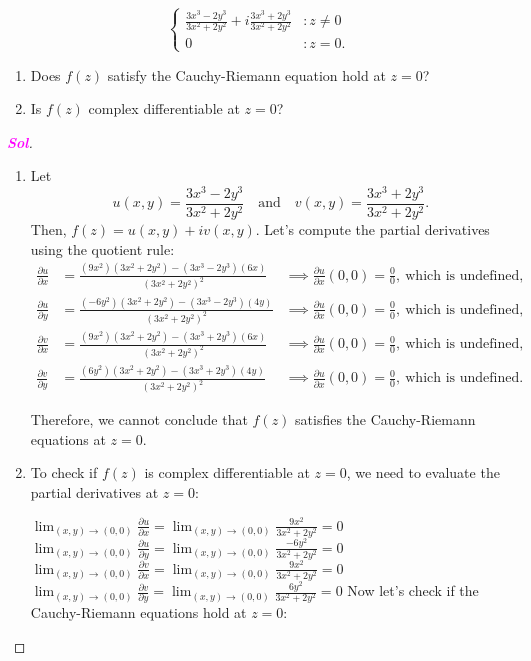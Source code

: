 \documentclass{article}
\theoremstyle{definition}
\newcommand{\of}[1]{\left( #1 \right)}
\newcommand{\sol}{\textcolor{magenta}{\bf Sol}}
\begin{document}
\begin{enumerate}
\[\begin{cases}
		\displaystyle\frac{3x^3-2y^3}{3x^2+2y^2}+i\frac{3x^3+2y^3}{3x^2+2y^2} &: z\neq 0\\
		0 &: z=0.
	\end{cases}
	\] \begin{enumerate}
		\item Does $f(z)$ satisfy the Cauchy-Riemann equation hold at $z=0$?
		\item Is $f(z)$ complex differentiable at $z=0$?
	\end{enumerate}
	\begin{proof}[\sol]
		\begin{enumerate}
			\item Let \[
			u(x, y) = \frac{3x^3 - 2y^3}{3x^2 + 2y^2}\quad\text{and}\quad v(x, y) = \frac{3x^3 + 2y^3}{3x^2 + 2y^2}.
			\] Then, $f(z) = u(x, y) + iv(x, y)$. Let's compute the partial derivatives using the quotient rule: \begin{align*}
				\frac{\partial u}{\partial x} &= \frac{(9x^2)(3x^2 + 2y^2) - (3x^3 - 2y^3)(6x)}{(3x^2 + 2y^2)^2} &\implies\frac{\partial u}{\partial x}\of{0,0}=\frac{0}{0},\ \text{which is undefined},\\
				\frac{\partial u}{\partial y} &= \frac{(-6y^2)(3x^2 + 2y^2) - (3x^3 - 2y^3)(4y)}{(3x^2 + 2y^2)^2}&\implies\frac{\partial u}{\partial x}\of{0,0}=\frac{0}{0},\ \text{which is undefined},\\
				\frac{\partial v}{\partial x} &= \frac{(9x^2)(3x^2 + 2y^2) - (3x^3 + 2y^3)(6x)}{(3x^2 + 2y^2)^2}&\implies\frac{\partial u}{\partial x}\of{0,0}=\frac{0}{0},\ \text{which is undefined},\\
				\frac{\partial v}{\partial y} &= \frac{(6y^2)(3x^2 + 2y^2) - (3x^3 + 2y^3)(4y)}{(3x^2 + 2y^2)^2}&\implies\frac{\partial u}{\partial x}\of{0,0}=\frac{0}{0},\ \text{which is undefined}.
			\end{align*}
			
			Therefore, we cannot conclude that $f(z)$ satisfies the Cauchy-Riemann equations at $z = 0$.
			
			\item To check if $f(z)$ is complex differentiable at $z = 0$, we need to evaluate the partial derivatives at $z = 0$:
			
			$\lim_{(x,y) \to (0,0)} \frac{\partial u}{\partial x} = \lim_{(x,y) \to (0,0)} \frac{9x^2}{3x^2 + 2y^2} = 0$
			$\lim_{(x,y) \to (0,0)} \frac{\partial u}{\partial y} = \lim_{(x,y) \to (0,0)} \frac{-6y^2}{3x^2 + 2y^2} = 0$
			$\lim_{(x,y) \to (0,0)} \frac{\partial v}{\partial x} = \lim_{(x,y) \to (0,0)} \frac{9x^2}{3x^2 + 2y^2} = 0$
			$\lim_{(x,y) \to (0,0)} \frac{\partial v}{\partial y} = \lim_{(x,y) \to (0,0)} \frac{6y^2}{3x^2 + 2y^2} = 0$
			Now let's check if the Cauchy-Riemann equations hold at $z = 0$:
			

\end{enumerate}
\end{proof}
\end{enumerate}
\end{document}
